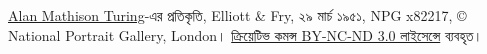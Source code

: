 \href{http://www.npg.org.uk/collections/search/portrait/mw63680/Alan-Mathison-Turing?}{Alan
Mathison Turing}-এর প্রতিকৃতি, Elliott \& Fry, ২৯ মার্চ ১৯৫১,
NPG x82217, \copyright{} National Portrait Gallery, London।
\href{http://creativecommons.org/licenses/by-nc-nd/3.0/}{ক্রিয়েটিভ কমন্স
BY-NC-ND 3.0 লাইসেন্সে} ব্যবহৃত।
